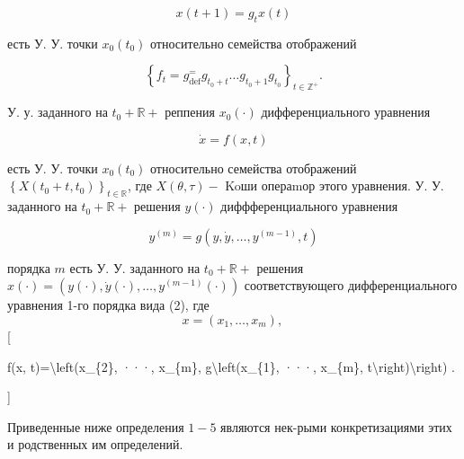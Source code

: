 \documentclass[10pt]{article}
\begin{document}
\[

x(t+1)=g_{t} x(t)

\]



есть У. У. точки $x_{0}\left(t_{0}\right)$ относительно семейства отображений



\[

\left\{f_{t}=g_{\operatorname{def}}^{=} g_{t_{0}+t} \ldots g_{t_{0}+1} g_{t_{0}}\right\}_{t \in \mathbb{Z}^{+}} .

\]



У. у. заданного на $t_{0}+\mathbb{R}+$ реппения $x_{0}(\cdot)$ дифференциального уравнения



\[

\dot{x}=f(x, t)

\]



есть У. У. точки $x_{0}\left(t_{0}\right)$ относительно семейства отображений $\left\{X\left(t_{0}+t, t_{0}\right)\right\}_{t \in \mathbb{R}}$, где $X(\theta, \tau)-$ Koши операmор этого уравнения. У. У. заданного на $t_{0}+\mathbb{R}+$ решения $y(\cdot)$ диффференциального уравнения



\[

y^{(m)}=g\left(y, \dot{y}, \ldots, y^{(m-1)}, t\right)

\]



порядка $m$ есть У. У. заданного на $t_{0}+\mathbb{R}+$ решения $x(\cdot)=\left(y(\cdot), \dot{y}(\cdot), \ldots, y^{(m-1)}(\cdot)\right)$ соответствующего дифференциального уравнения 1-го порядка вида (2), где\[

x=\left(x_{1}, \ldots, x_{m}\right) \text {, }

\][



f(x, t)=\textbackslash left(x\_\{2\}, ···, x\_\{m\}, g\textbackslash left(x\_\{1\}, ···, x\_\{m\}, t\textbackslash right)\textbackslash right) .

]



Приведенные ниже определения $1-5$ являются нек-рыми конкретизациями этих и родственных им определений.
\end{document}
